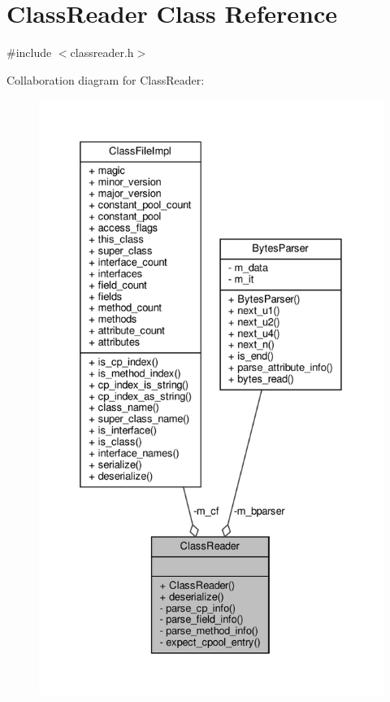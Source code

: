 \hypertarget{classClassReader}{}\section{Class\+Reader Class Reference}
\label{classClassReader}


{\ttfamily \#include $<$classreader.\+h$>$}



Collaboration diagram for Class\+Reader\+:
\nopagebreak
\begin{figure}[H]
\begin{center}
\leavevmode
\includegraphics[height=550pt]{classClassReader__coll__graph}
\end{center}
\end{figure}
